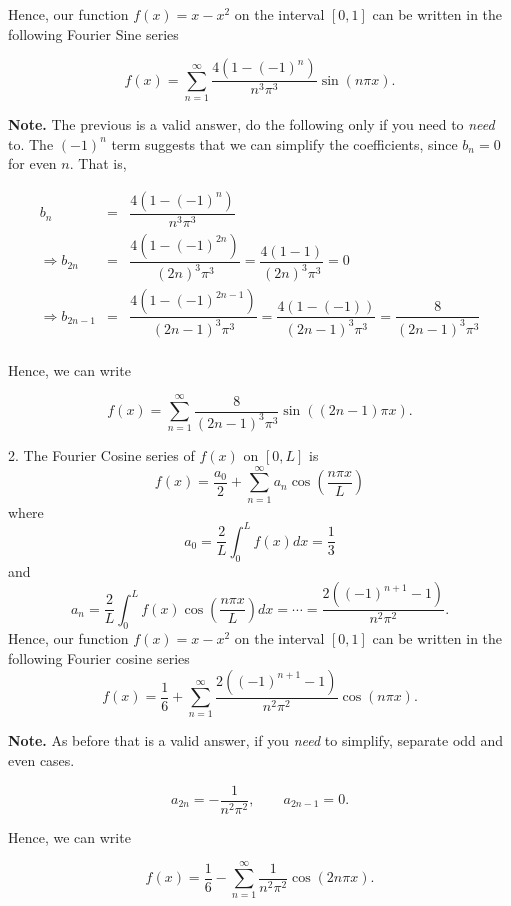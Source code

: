 \documentclass[11pt]{article}
\begin{document}
\begin{solution}
Hence, our function $f(x) = x - x^2$  on the interval $ [0,1]$ can be written in the following Fourier Sine series

\begin{equation*}
\boxed{f(x) = \sum_{n=1}^{\infty} \dfrac{4(1-(-1)^n)}{n^3 \pi^3} \sin( n\pi x)}. 
\end{equation*}


\textbf{Note.} The previous is a valid answer, do the following only if you need to \textsl{need} to. The $(-1)^{n}$ term suggests that we can simplify the coefficients, since $b_{n}=0$ for even $n$. That is,

\begin{eqnarray*}
b_{n} & = & \dfrac{4(1-(-1)^n)}{n^3 \pi^3} \\
\Rightarrow b_{2n}& = & \dfrac{4(1-(-1)^{2n})}{(2n)^3 \pi^3} = \dfrac{4(1-1)}{(2n)^3 \pi^3} =0 \\
\Rightarrow b_{2n-1}& = & \dfrac{4(1-(-1)^{2n-1})}{(2n-1)^3 \pi^3} = \dfrac{4(1-(-1))}{(2n-1)^3 \pi^3} = \dfrac{8}{(2n-1)^3 \pi^3} \\
\end{eqnarray*}

Hence, we can write

\begin{equation*}
f(x) = \sum_{n=1}^{\infty} \dfrac{8}{(2n-1)^3 \pi^3}\sin( (2n-1)\pi x). 
\end{equation*}

2. The Fourier Cosine series of $f(x)$ on $[0, L]$ is
\begin{equation*}
f(x) = \frac{a_{0}}{2}+\sum_{n=1}^{\infty} a_{n} \cos \left(\dfrac{n\pi x}{L}\right)
\end{equation*}
where
\[a_{0}=\frac{2}{L}\int_{0}^{L}f(x)dx = \frac{1}{3}\]
and
\begin{equation*}
a_{n}=\frac{2}{L}\int_{0}^{L}f(x)\cos \left(\dfrac{n\pi x}{L}\right) dx =\cdots = \frac{2((-1)^{n+1}-1)}{n^{2}\pi^{2}}.
\end{equation*}
Hence, our function $f(x) = x - x^2$  on the interval $[0,1]$ can be written in the following Fourier cosine series
\begin{equation*}
\boxed{f(x) = \frac{1}{6}+\sum_{n=1}^{\infty} \frac{2((-1)^{n+1}-1)}{n^{2}\pi^{2}} \cos \left({n\pi x}\right)}.
\end{equation*}

\textbf{Note.} As before that is a valid answer, if you \textsl{need} to simplify, separate odd and even cases.

\[a_{2n}=-\frac{1}{n^{2}\pi^{2}}, \qquad a_{2n-1}=0.\]

Hence, we can write

\begin{equation*}
f(x) = \frac{1}{6}-\sum_{n=1}^{\infty} \frac{1}{n^{2}\pi^{2}} \cos \left({2n\pi x}\right).
\end{equation*}
\end{solution}
\end{document}
